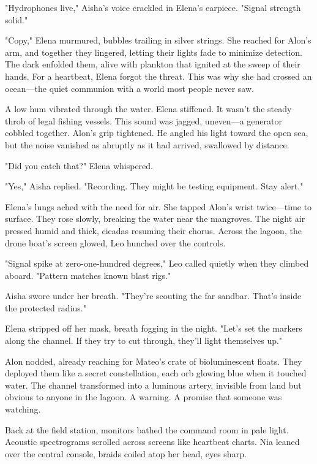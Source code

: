 "Hydrophones live," Aisha's voice crackled in Elena's earpiece. "Signal strength solid."

"Copy," Elena murmured, bubbles trailing in silver strings. She reached for Alon's arm, and together they lingered, letting their lights fade to minimize detection. The dark enfolded them, alive with plankton that ignited at the sweep of their hands. For a heartbeat, Elena forgot the threat. This was why she had crossed an ocean—the quiet communion with a world most people never saw.

A low hum vibrated through the water. Elena stiffened. It wasn't the steady throb of legal fishing vessels. This sound was jagged, uneven—a generator cobbled together. Alon's grip tightened. He angled his light toward the open sea, but the noise vanished as abruptly as it had arrived, swallowed by distance.

"Did you catch that?" Elena whispered.

"Yes," Aisha replied. "Recording. They might be testing equipment. Stay alert."

Elena's lungs ached with the need for air. She tapped Alon's wrist twice—time to surface. They rose slowly, breaking the water near the mangroves. The night air pressed humid and thick, cicadas resuming their chorus. Across the lagoon, the drone boat's screen glowed, Leo hunched over the controls.

"Signal spike at zero-one-hundred degrees," Leo called quietly when they climbed aboard. "Pattern matches known blast rigs."

Aisha swore under her breath. "They're scouting the far sandbar. That's inside the protected radius."

Elena stripped off her mask, breath fogging in the night. "Let's set the markers along the channel. If they try to cut through, they'll light themselves up."

Alon nodded, already reaching for Mateo's crate of bioluminescent floats. They deployed them like a secret constellation, each orb glowing blue when it touched water. The channel transformed into a luminous artery, invisible from land but obvious to anyone in the lagoon. A warning. A promise that someone was watching.

\bigskip

Back at the field station, monitors bathed the command room in pale light. Acoustic spectrograms scrolled across screens like heartbeat charts. Nia leaned over the central console, braids coiled atop her head, eyes sharp.

